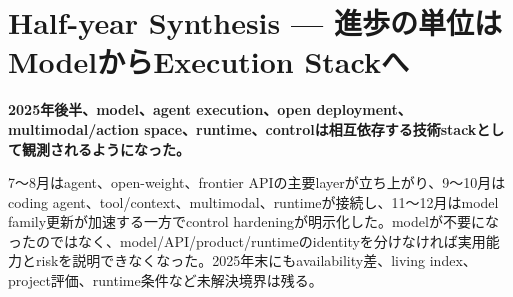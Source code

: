 \section{Half-year Synthesis — 進歩の単位はModelからExecution Stackへ}
\label{pkg:synth}
\noindent\textbf{2025年後半、model、agent execution、open deployment、multimodal/action space、runtime、controlは相互依存する技術stackとして観測されるようになった。}\autocite{src-05738f6c55b7,src-7a7213b68631,src-964121647555,src-aec54e92a7f3,src-b074ccdb2d9e}

7〜8月はagent、open-weight、frontier APIの主要layerが立ち上がり、9〜10月はcoding agent、tool/context、multimodal、runtimeが接続し、11〜12月はmodel family更新が加速する一方でcontrol hardeningが明示化した。modelが不要になったのではなく、model/API/product/runtimeのidentityを分けなければ実用能力とriskを説明できなくなった。2025年末にもavailability差、living index、project評価、runtime条件など未解決境界は残る。\autocite{src-05738f6c55b7,src-12865e8612c7,src-1c46fdf17c79,src-43eaa2f12960,src-455a78bc36fa,src-58ef6e84aa65,src-7a7213b68631,src-964121647555,src-a24fd97eb3d0,src-ad13fe7d3321,src-aec54e92a7f3,src-b074ccdb2d9e,src-dd5d9b8662f3,src-f6aa679babd7}

